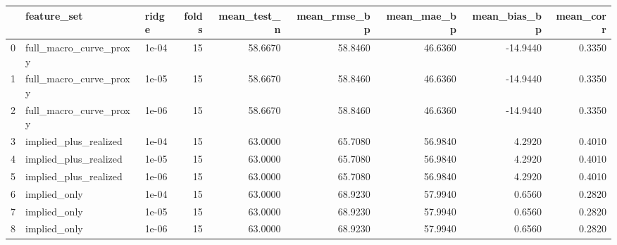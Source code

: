 \begin{tabular}{lllrrrrrr}
\toprule
 & feature\_set & ridge & folds & mean\_test\_n & mean\_rmse\_bp & mean\_mae\_bp & mean\_bias\_bp & mean\_corr \\
\midrule
0 & full\_macro\_curve\_proxy & 1e-04 & 15 & 58.6670 & 58.8460 & 46.6360 & -14.9440 & 0.3350 \\
1 & full\_macro\_curve\_proxy & 1e-05 & 15 & 58.6670 & 58.8460 & 46.6360 & -14.9440 & 0.3350 \\
2 & full\_macro\_curve\_proxy & 1e-06 & 15 & 58.6670 & 58.8460 & 46.6360 & -14.9440 & 0.3350 \\
3 & implied\_plus\_realized & 1e-04 & 15 & 63.0000 & 65.7080 & 56.9840 & 4.2920 & 0.4010 \\
4 & implied\_plus\_realized & 1e-05 & 15 & 63.0000 & 65.7080 & 56.9840 & 4.2920 & 0.4010 \\
5 & implied\_plus\_realized & 1e-06 & 15 & 63.0000 & 65.7080 & 56.9840 & 4.2920 & 0.4010 \\
6 & implied\_only & 1e-04 & 15 & 63.0000 & 68.9230 & 57.9940 & 0.6560 & 0.2820 \\
7 & implied\_only & 1e-05 & 15 & 63.0000 & 68.9230 & 57.9940 & 0.6560 & 0.2820 \\
8 & implied\_only & 1e-06 & 15 & 63.0000 & 68.9230 & 57.9940 & 0.6560 & 0.2820 \\
\bottomrule
\end{tabular}
